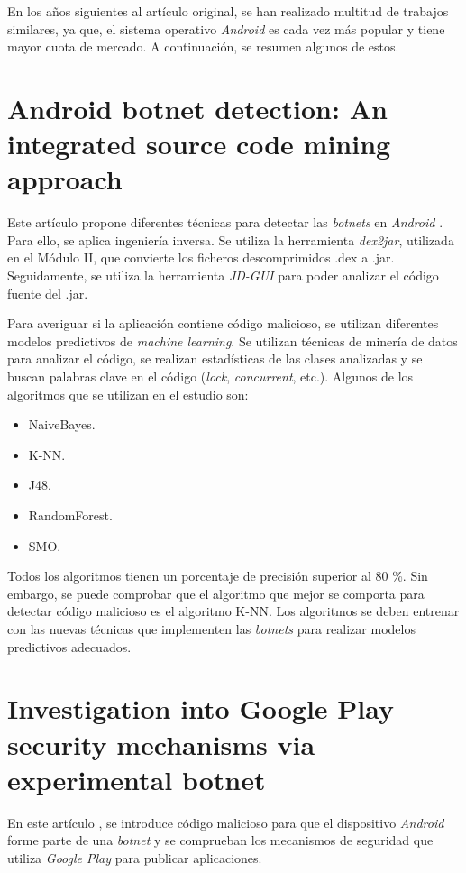 \documentclass[a4paper,11pt]{report}
\begin{document}
En los años siguientes al artículo original, se han realizado multitud de trabajos similares, ya que, el sistema operativo \emph{Android} es cada vez más popular y tiene mayor cuota de mercado. A continuación, se resumen algunos de estos.

\section{Android botnet detection: An integrated source code mining approach}

Este artículo propone diferentes técnicas para detectar las \emph{botnets} en \emph{Android} \cite{posterior1}. Para ello, se aplica ingeniería inversa. Se utiliza la herramienta \emph{dex2jar}, utilizada en el Módulo II, que convierte los ficheros descomprimidos .dex a .jar. Seguidamente, se utiliza la herramienta \emph{JD-GUI} para poder analizar el código fuente del .jar.

Para averiguar si la aplicación contiene código malicioso, se utilizan diferentes modelos predictivos de \emph{machine learning}. Se utilizan técnicas de minería de datos para analizar el código, se realizan estadísticas de las clases analizadas y se buscan palabras clave en el código (\emph{lock}, \emph{concurrent}, etc.). Algunos de los algoritmos que se utilizan en el estudio son:

\begin{itemize}
\item NaiveBayes.
\item K-NN.
\item J48.
\item RandomForest.
\item SMO.
\end{itemize}

Todos los algoritmos tienen un porcentaje de precisión superior al 80 \%{}. Sin embargo, se puede comprobar que el algoritmo que mejor se comporta para detectar código malicioso es el algoritmo K-NN. Los algoritmos se deben entrenar con las nuevas técnicas que implementen las \emph{botnets} para realizar modelos predictivos adecuados.

\section{Investigation into Google Play security mechanisms via experimental botnet}

En este artículo \cite{posterior2}, se introduce código malicioso para que el dispositivo \emph{Android} forme parte de una \emph{botnet} y se comprueban los mecanismos de seguridad que utiliza \emph{Google Play} para publicar aplicaciones.
\end{document}
